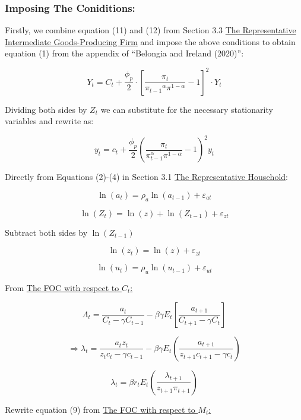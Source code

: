 \documentclass[11pt,preprint, authoryear]{elsarticle}
\numberwithin{equation}{section}
\numberwithin{figure}{section}
\numberwithin{table}{section}
\begin{document}
\hypertarget{imposing-the-coniditions}{%
\subsubsection{Imposing The
Coniditions:}\label{imposing-the-coniditions}}

Firstly, we combine equation (11) and (12) from Section 3.3
\protect\hyperlink{the-representative-intermediate-goods-producing-firm}{The
Representative Intermediate Goods-Producing Firm} and impose the above
conditions to obtain equation (1) from the appendix of ``Belongia and
Ireland (2020)'':

\[Y_{t} = C_t + \frac{\phi_{p}}{2} \cdot \left[ \frac{\pi_{t}}{{\pi_{t-1}}^{\alpha} \pi^{1-\alpha}} -1 \right]^{2} \cdot Y_t \]

Dividing both sides by \(Z_t\) we can substitute for the necessary
stationarity variables and rewrite as:

\[y_{t}=c_{t}+\frac{\phi_{p}}{2}\left(\frac{\pi_{t}}{\pi_{t-1}^{\alpha} \pi^{1-\alpha}}-1\right)^{2} y_{t} \tag{1}\]

Directly from Equations (2)-(4) in Section 3.1
\protect\hyperlink{the-representative-household}{The Representative
Household}:

\[\ln \left(a_{t}\right)=\rho_{a} \ln \left(a_{t-1}\right)+\varepsilon_{a t} \tag{2}\]

\[\ln \left(Z_{t}\right)=\ln (z) + \ln(Z_{t-1}) +\varepsilon_{z t}\]

Subtract both sides by \(\ln(Z_{t-1})\)

\[\ln \left(z_{t}\right)=\ln (z)+\varepsilon_{z t} \tag{3}\]

\[\ln \left(u_{t}\right)=\rho_{u} \ln \left(u_{t-1}\right)+\varepsilon_{u t} \tag{4} \]

From \protect\hyperlink{the-foc-with-respect-to-c_t}{The FOC with
respect to \(C_t\):}

\[ \Lambda_t = \frac{a_t}{C_t-\gamma C_{t-1}} - \beta \gamma E_t \left[ \frac{a_{t+1}}{C_{t+1} - \gamma C_t} \right] \]

\[\Rightarrow \lambda_{t}=\frac{a_{t}z_{t}}{z_{t} c_{t}-\gamma c_{t-1}}-\beta \gamma E_{t}\left(\frac{a_{t+1}}{z_{t+1} c_{t+1}-\gamma c_{t}}\right) \tag{5}\]

\[\lambda_{t}=\beta r_{t} E_{t}\left(\frac{\lambda_{t+1}}{z_{t+1} \pi_{t+1}}\right) \tag{7}\]

Rewrite equation (9) from
\protect\hyperlink{the-foc-with-respect-to-m_t}{The FOC with respect to
\(M_t\):}
\end{document}
